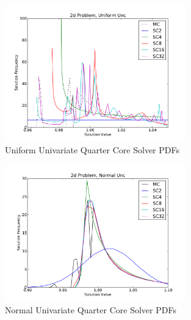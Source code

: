 \begin{figure}[H]
\centering
   \includegraphics[width=0.7\textwidth]{../graphics/2d_uniform_pdfs}
   \caption{Uniform Univariate Quarter Core Solver PDFs}
   \label{fig:2dcrit uni}
\end{figure}
\begin{figure}[H]
\centering
   \includegraphics[width=0.7\textwidth]{../graphics/2d_normal_pdfs}
   \caption{Normal Univariate Quarter Core Solver PDFs}
   \label{fig:2dcrit}
\end{figure}
